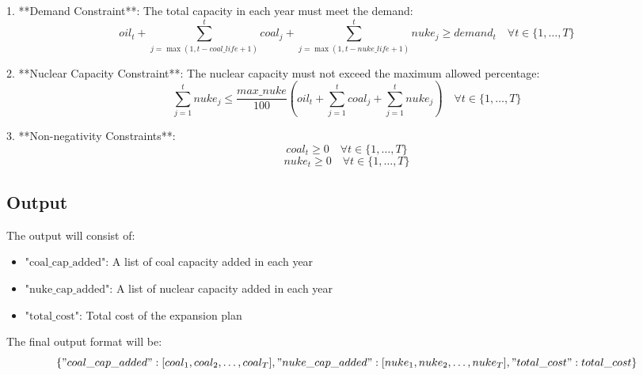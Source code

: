 \documentclass{article}
\begin{document}
1. **Demand Constraint**:
   The total capacity in each year must meet the demand:
   \[
   oil_t + \sum_{j=\max(1, t - coal\_life + 1)}^t coal_j + \sum_{j=\max(1, t - nuke\_life + 1)}^t nuke_j \geq demand_t \quad \forall t \in \{1, \ldots, T\}
   \]

2. **Nuclear Capacity Constraint**:
   The nuclear capacity must not exceed the maximum allowed percentage:
   \[
   \sum_{j=1}^t nuke_j \leq \frac{max\_nuke}{100} \left( oil_t + \sum_{j=1}^t coal_j + \sum_{j=1}^t nuke_j \right) \quad \forall t \in \{1, \ldots, T\}
   \]

3. **Non-negativity Constraints**:
   \[
   coal_t \geq 0 \quad \forall t \in \{1, \ldots, T\}
   \]
   \[
   nuke_t \geq 0 \quad \forall t \in \{1, \ldots, T\}
   \]

\subsection*{Output}
The output will consist of:
\begin{itemize}
    \item $\text{"coal\_cap\_added"}$: A list of coal capacity added in each year
    \item $\text{"nuke\_cap\_added"}$: A list of nuclear capacity added in each year
    \item $\text{"total\_cost"}$: Total cost of the expansion plan
\end{itemize}

The final output format will be:
\[
\{
    "coal\_cap\_added": [coal_1, coal_2, \ldots, coal_T],
    "nuke\_cap\_added": [nuke_1, nuke_2, \ldots, nuke_T],
    "total\_cost": total\_cost
\}
\]
\end{document}
